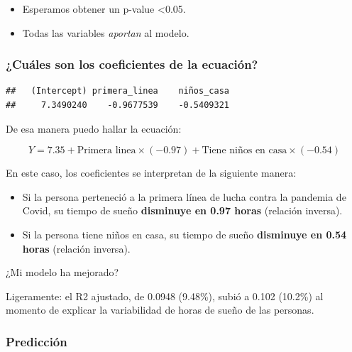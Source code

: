 \documentclass[
]{article}
\newenvironment{Shaded}{\begin{snugshade}}{\end{snugshade}}
\newcommand{\NormalTok}[1]{#1}
\newcommand{\SpecialCharTok}[1]{\textcolor[rgb]{0.81,0.36,0.00}{\textbf{#1}}}
\providecommand{\tightlist}{%
  \setlength{\itemsep}{0pt}\setlength{\parskip}{0pt}}
\begin{document}
\begin{itemize}
\tightlist
\item
  Esperamos obtener un p-value \textless0.05.
\item
  Todas las variables \emph{aportan} al modelo.
\end{itemize}

\subsubsection{\texorpdfstring{\textbf{¿Cuáles son los coeficientes de
la
ecuación?}}{¿Cuáles son los coeficientes de la ecuación?}}\label{cuuxe1les-son-los-coeficientes-de-la-ecuaciuxf3n-3}

\begin{Shaded}
\end{Shaded}

\begin{verbatim}
##   (Intercept) primera_linea    niños_casa 
##     7.3490240    -0.9677539    -0.5409321
\end{verbatim}

De esa manera puedo hallar la ecuación:

\[
Y = 7.35  + \text{Primera linea} \times (-0.97) +  \text{Tiene niños en casa} \times (-0.54)
\]

En este caso, los coeficientes se interpretan de la siguiente manera:

\begin{itemize}
\item
  Si la persona perteneció a la primera línea de lucha contra la
  pandemia de Covid, su tiempo de sueño \textbf{disminuye en 0.97 horas}
  (relación inversa).
\item
  Si la persona tiene niños en casa, su tiempo de sueño
  \textbf{disminuye en 0.54 horas} (relación inversa).
\end{itemize}

¿Mi modelo ha mejorado?

Ligeramente: el R2 ajustado, de 0.0948 (9.48\%), subió a 0.102 (10.2\%)
al momento de explicar la variabilidad de horas de sueño de las
personas.

\subsubsection{\texorpdfstring{\textbf{Predicción}}{Predicción}}\label{predicciuxf3n-1}
\end{document}
